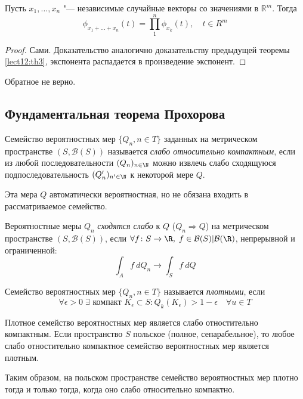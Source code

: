 \documentclass[a4paper,reqno]{amsart}
\begin{document}
\begin{lemma} \label{lect12:lem2}
    Пусть $x_1, \ldots, x_n$ "--- независимые случайные векторы со значениями в $\mathbb{R}^{m}$. Тогда
    $$\phi_{x_1 + \ldots + x_n} (t) = \prod_1^n \phi_{x_k}(t) , \quad t \in R^m$$
\end{lemma}
\begin{proof}
    Сами. Доказательство аналогично доказательству предыдущей теоремы \ref{lect12:th3}, экспонента распадается в произведение экспонент.
\end{proof}
\begin{nb}
    Обратное не верно.
\end{nb}
\subsection{Фундаментальная теорема Прохорова}
\begin{definition} \label{lect12:def2}
    Семейство вероятностных мер $\{Q_n, n \in T\}$ заданных на метрическом пространстве $(S, \mathcal{B}(S))$ называется \emph{слабо относительно компактным}, если из любой последовательности $(Q_n)_{n\in\N}$ можно извлечь слабо сходящуюся подпоследовательность $(Q_n')_{n'\in\N}$ к некоторой мере $Q$.
\end{definition}
\begin{nb}
    Эта мера $Q$ автоматически вероятностная, но не обязана входить в рассматриваемое семейство.
\end{nb}
\begin{definition} \label{lect12:def3}
    Вероятностные меры $Q_n$ \emph{сходятся слабо} к $Q$ ($Q_n \Rightarrow Q$) на метрическом пространстве $(S, \mathcal{B}(S))$, если
    $\forall f\colon S\to\R, \; f\in \mathcal{B}(S) | \mathcal{B}(\R)$, непрерывной и ограниченной:
    $$\int_A f\: dQ_n \to \int_S f\:dQ$$
\end{definition}
\begin{definition} \label{lect12:def4}
    Семейство вероятностных мер $\{Q_n, n \in T\}$ называется \emph{плотными}, если 
    $$\forall \epsilon > 0 \; \exists \mbox{ компакт }K_\epsilon \subset S\colon Q_k(K_\epsilon) > 1- \epsilon \quad \forall u \in T$$
\end{definition}
\begin{theorem}[Прохоров] \label{lect12:th4}
    Плотное семейство вероятностных мер является слабо отностительно компактным. Если пространство $S$ польское (полное, сепарабельное), то любое слабо отностительно компактное семейство вероятностных мер является плотным.

    Таким образом, на польском пространстве семейство вероятностных мер плотно тогда и только тогда, когда оно слабо относительно компактно.
\end{theorem}
\end{document}
